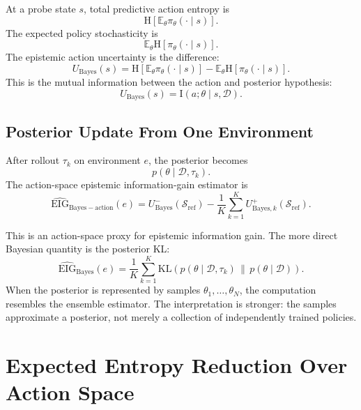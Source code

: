 \documentclass[11pt]{article}
\newcommand{\D}{\mathcal{D}}
\newcommand{\E}{\mathbb{E}}
\newcommand{\Sref}{\mathcal{S}_{\mathrm{ref}}}
\newcommand{\KL}{\mathrm{KL}}
\newcommand{\Hent}{\mathrm{H}}
\newcommand{\I}{\mathrm{I}}
\begin{document}
At a probe state $s$, total predictive action entropy is
\begin{equation}
  \Hent\left[
    \E_{\theta}\pi_{\theta}(\cdot \mid s)
  \right].
\end{equation}
The expected policy stochasticity is
\begin{equation}
  \E_{\theta}
  \Hent[\pi_{\theta}(\cdot \mid s)].
\end{equation}
The epistemic action uncertainty is the difference:
\begin{equation}
  U_{\mathrm{Bayes}}(s)
  =
  \Hent\left[
    \E_{\theta}\pi_{\theta}(\cdot \mid s)
  \right]
  -
  \E_{\theta}
  \Hent[\pi_{\theta}(\cdot \mid s)].
\end{equation}
This is the mutual information between the action and posterior hypothesis:
\begin{equation}
  U_{\mathrm{Bayes}}(s)
  =
  \I(a;\theta \mid s,\D).
\end{equation}

\subsection{Posterior Update From One Environment}

After rollout $\tau_k$ on environment $e$, the posterior becomes
\begin{equation}
  p(\theta \mid \D,\tau_k).
\end{equation}
The action-space epistemic information-gain estimator is
\begin{equation}
  \widehat{\mathrm{EIG}}_{\mathrm{Bayes-action}}(e)
  =
  U_{\mathrm{Bayes}}^-(\Sref)
  -
  \frac{1}{K}\sum_{k=1}^{K}
  U_{\mathrm{Bayes},k}^+(\Sref).
\end{equation}

This is an action-space proxy for epistemic information gain. The more direct
Bayesian quantity is the posterior KL:
\begin{equation}
  \widehat{\mathrm{EIG}}_{\mathrm{Bayes}}(e)
  =
  \frac{1}{K}\sum_{k=1}^{K}
  \KL\left(
    p(\theta \mid \D,\tau_k)
    \,\|\,
    p(\theta \mid \D)
  \right).
\end{equation}
When the posterior is represented by samples
$\theta_1,\ldots,\theta_N$, the computation resembles the ensemble estimator.
The interpretation is stronger: the samples approximate a posterior, not merely
a collection of independently trained policies.

\section{Expected Entropy Reduction Over Action Space}
\end{document}

